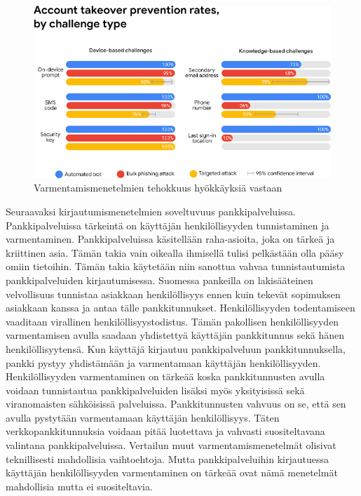 \begin{figure}[ht]
    \centering
    \includegraphics[width=12cm]{template/figures/account takeover provention rates.png}
    \caption{Varmentamismenetelmien tehokkuus hyökkäyksiä vastaan \citep{google_security}}
    \label{fig:account_takeover_rates}
\end{figure}

Seuraavaksi kirjautumismenetelmien soveltuvuus pankkipalveluissa. Pankkipalveluissa tärkeintä on käyttäjän henkilöllisyyden tunnistaminen ja varmentaminen. Pankkipalveluissa käsitellään raha-asioita, joka on tärkeä ja kriittinen asia. Tämän takia vain oikealla ihmisellä tulisi pelkästään olla pääsy omiin tietoihin. Tämän takia käytetään niin sanottua vahvaa tunnistautumista pankkipalveluiden kirjautumisessa. \citep{kpclient}
Suomessa pankeilla on lakisääteinen velvollisuus tunnistaa asiakkaan henkilöllisyys ennen kuin tekevät sopimuksen asiakkaan kanssa ja antaa tälle pankkitunnukset. Henkilöllisyyden todentamiseen vaaditaan virallinen henkilöllisyystodistus. Tämän pakollisen henkilöllisyyden varmentamisen avulla saadaan yhdistettyä käyttäjän pankkitunnus sekä hänen henkilöllisyytensä. Kun käyttäjä kirjautuu pankkipalveluun pankkitunnuksella, pankki pystyy yhdistämään ja varmentamaan käyttäjän henkilöllisyyden. Henkilöllisyyden varmentaminen on tärkeää koska pankkitunnusten avulla voidaan tunnistautua pankkipalveluiden lisäksi myös yksityisissä sekä viranomaisten sähköisissä palveluissa. \citep{FINE_verkkopankkitunnukset}
Pankkitunnusten vahvuus on se, että sen avulla pystytään varmentamaan käyttäjän henkilöllisyys. Täten verkkopankkitunnuksia voidaan pitää luotettava ja vahvasti suositeltavana valintana pankkipalveluissa.
Vertailun muut varmentamismenetelmät olisivat teknillisesti mahdollisia vaihtoehtoja. Mutta pankkipalveluihin kirjautuessa käyttäjän henkilöllisyyden varmentaminen on tärkeää ovat nämä menetelmät mahdollisia mutta ei suositeltavia.

